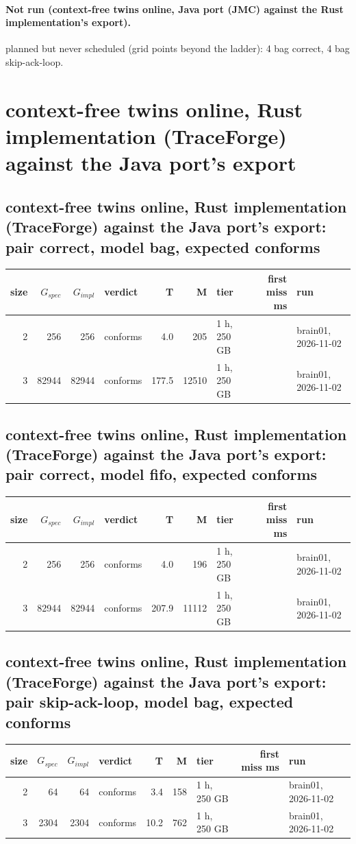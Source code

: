 \documentclass[10pt]{article}
\begin{document}
\paragraph{Not run (context-free twins online, Java port (JMC) against the Rust implementation's export).}
planned but never scheduled (grid points beyond the ladder): 4 bag correct, 4 bag skip-ack-loop.\par
\section*{context-free twins online, Rust implementation (TraceForge) against the Java port's export}
\subsection*{context-free twins online, Rust implementation (TraceForge) against the Java port's export: pair \textsf{correct}, model bag, expected conforms}
\begin{longtable}{@{}rrrlrrlrl@{}}
\toprule
size & $G_{\mathit{spec}}$ & $G_{\mathit{impl}}$ & verdict & T & M & tier & first miss ms & run \\
\midrule
\endhead
\color{red} 2 & 256 & 256 & conforms & 4.0 & 205 & 1 h, 250 GB &  & brain01, 2026-11-02 \\
\color{red} 3 & 82944 & 82944 & conforms & 177.5 & 12510 & 1 h, 250 GB &  & brain01, 2026-11-02 \\
\bottomrule
\end{longtable}
\subsection*{context-free twins online, Rust implementation (TraceForge) against the Java port's export: pair \textsf{correct}, model fifo, expected conforms}
\begin{longtable}{@{}rrrlrrlrl@{}}
\toprule
size & $G_{\mathit{spec}}$ & $G_{\mathit{impl}}$ & verdict & T & M & tier & first miss ms & run \\
\midrule
\endhead
\color{red} 2 & 256 & 256 & conforms & 4.0 & 196 & 1 h, 250 GB &  & brain01, 2026-11-02 \\
\color{red} 3 & 82944 & 82944 & conforms & 207.9 & 11112 & 1 h, 250 GB &  & brain01, 2026-11-02 \\
\bottomrule
\end{longtable}
\subsection*{context-free twins online, Rust implementation (TraceForge) against the Java port's export: pair \textsf{skip-ack-loop}, model bag, expected conforms}
\begin{longtable}{@{}rrrlrrlrl@{}}
\toprule
size & $G_{\mathit{spec}}$ & $G_{\mathit{impl}}$ & verdict & T & M & tier & first miss ms & run \\
\midrule
\endhead
\color{red} 2 & 64 & 64 & conforms & 3.4 & 158 & 1 h, 250 GB &  & brain01, 2026-11-02 \\
\color{red} 3 & 2304 & 2304 & conforms & 10.2 & 762 & 1 h, 250 GB &  & brain01, 2026-11-02 \\
\bottomrule
\end{longtable}
\end{document}
